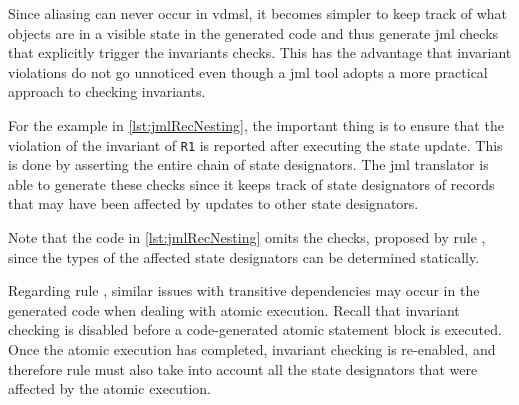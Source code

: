 Since aliasing can never occur in \ac{vdmsl}, it becomes simpler to
keep track of what objects are in a visible state in the generated
code and thus generate \ac{jml} checks that explicitly trigger the
invariants checks. This has the advantage that invariant violations do
not go unnoticed even though a \ac{jml} tool adopts a more practical
approach to checking invariants.

For the example in \autoref{lst:jmlRecNesting}, the important thing is
to ensure that the violation of the invariant of \texttt{R1} is
reported after executing the state update. This is done by asserting
the entire chain of state designators. The \ac{jml} translator is able
to generate these checks since it keeps track of state designators of
records that may have been affected by updates to other state
designators.


%
%

Note that the code in \autoref{lst:jmlRecNesting} omits the
  checks, proposed by rule ,
since the types of the affected state designators can be determined
statically.

Regarding rule , similar issues with transitive
dependencies may occur in the generated code when dealing with atomic
execution. Recall that invariant checking is disabled before a
code-generated atomic statement block is executed. Once the atomic
execution has completed, invariant checking is re-enabled, and
therefore rule  must also take into account all the
state designators that were affected by the atomic execution.

